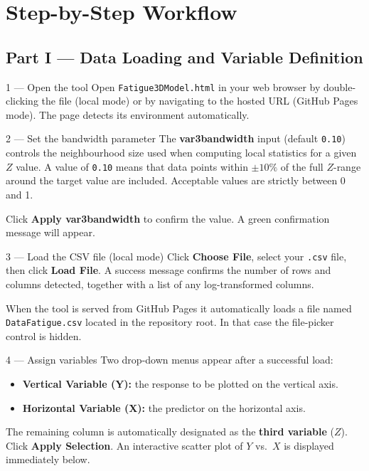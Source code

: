 \documentclass[12pt,a4paper]{article}
\begin{document}
\section{Step-by-Step Workflow}

\subsection{Part I --- Data Loading and Variable Definition}

\begin{stepbox}{1 --- Open the tool}
Open \texttt{Fatigue3DModel.html} in your web browser by double-clicking the file
(local mode) or by navigating to the hosted URL (GitHub Pages mode).  The page
detects its environment automatically.
\end{stepbox}

\begin{stepbox}{2 --- Set the bandwidth parameter}
The \textbf{var3bandwidth} input (default \texttt{0.10}) controls the neighbourhood
size used when computing local statistics for a given $Z$ value.  A value of
\texttt{0.10} means that data points within $\pm 10\%$ of the full $Z$-range around
the target value are included.  Acceptable values are strictly between 0 and 1.

Click \textbf{Apply var3bandwidth} to confirm the value.  A green confirmation
message will appear.
\end{stepbox}

\begin{stepbox}{3 --- Load the CSV file (local mode)}
Click \textbf{Choose File}, select your \texttt{.csv} file, then click
\textbf{Load File}.  A success message confirms the number of rows and columns
detected, together with a list of any log-transformed columns.
\end{stepbox}

\begin{notebox}
    When the tool is served from GitHub Pages it automatically loads a file named
    \texttt{DataFatigue.csv} located in the repository root.  In that case the
    file-picker control is hidden.
\end{notebox}

\begin{stepbox}{4 --- Assign variables}
Two drop-down menus appear after a successful load:
\begin{itemize}[leftmargin=1.5em]
    \item \textbf{Vertical Variable (Y):} the response to be plotted on the vertical axis.
    \item \textbf{Horizontal Variable (X):} the predictor on the horizontal axis.
\end{itemize}
The remaining column is automatically designated as the \textbf{third variable} ($Z$).
Click \textbf{Apply Selection}.  An interactive scatter plot of $Y$ vs.\ $X$ is
displayed immediately below.
\end{stepbox}
\end{document}
